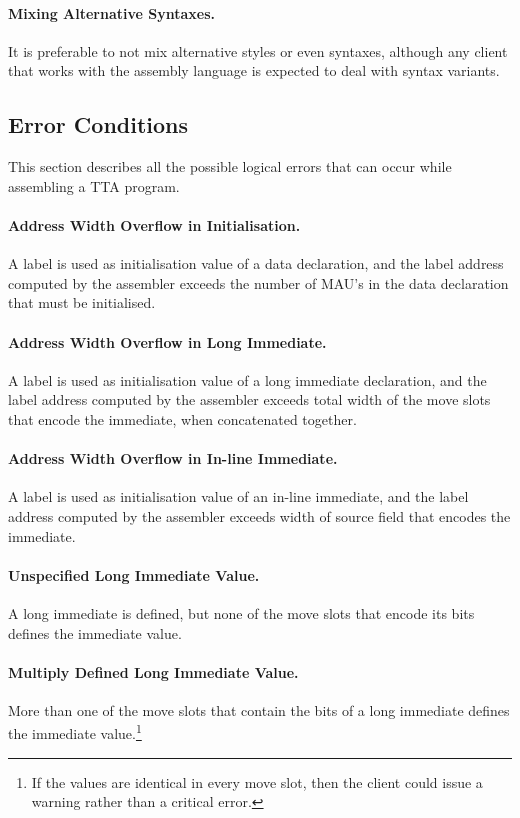 \documentclass[a4paper,twoside]{tceusermanual}
\begin{document}
\paragraph{Mixing Alternative Syntaxes.}
It is preferable to not mix alternative styles or even syntaxes, although
any client that works with the assembly language is expected to deal with
syntax variants.

\subsection{Error Conditions}
\label{ssec:errors}

This section describes all the possible logical errors that can occur while
assembling a TTA program.

\paragraph{Address Width Overflow in Initialisation.}
A label is used as initialisation value of a data declaration, and the label
address computed by the assembler exceeds the number of MAU's in the data
declaration that must be initialised.

\paragraph{Address Width Overflow in Long Immediate.}
A label is used as initialisation value of a long immediate declaration, and
the label address computed by the assembler exceeds total width of the move
slots that encode the immediate, when concatenated together.

\paragraph{Address Width Overflow in In-line Immediate.}
A label is used as initialisation value of an in-line immediate, and the
label address computed by the assembler exceeds width of source field that
encodes the immediate.

\paragraph{Unspecified Long Immediate Value.}
A long immediate is defined, but none of the move slots that encode its bits
defines the immediate value.

\paragraph{Multiply Defined Long Immediate Value.}
More than one of the move slots that contain the bits of a long immediate
defines the immediate value.\footnote{
%
  If the values are identical in every move slot, then the client could
  issue a warning rather than a critical error.}
\end{document}
